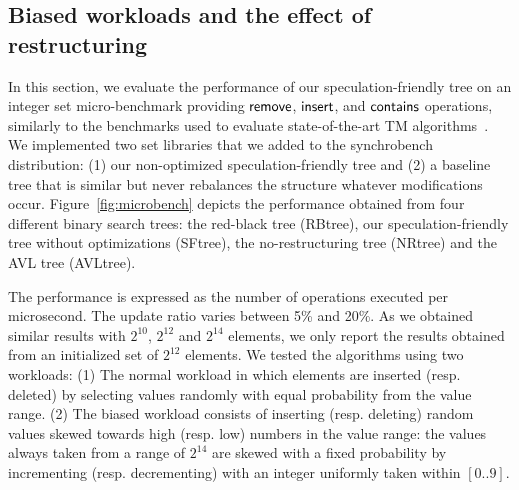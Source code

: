 \subsection{Biased workloads and the effect of restructuring}\label{ssec:microbench}

In this section, we evaluate the performance of our speculation-friendly tree on an integer set micro-benchmark providing $\act{remove}$, $\act{insert}$, and $\act{contains}$ operations, similarly to the benchmarks used to evaluate state-of-the-art TM algorithms~\cite{FFR08,FGG09,DSS10}.
We implemented two set libraries that we added to the synchrobench distribution:
(1) our non-optimized speculation-friendly tree and (2) a baseline tree that is similar but never rebalances the structure whatever modifications occur.
Figure~\ref{fig:microbench} depicts the performance obtained from four different binary search trees: the red-black tree (RBtree), our speculation-friendly tree without optimizations (SFtree), the no-restructuring tree (NRtree) and the AVL tree (AVLtree). 

The performance is expressed as the number of operations executed per microsecond. The update ratio varies between 5\% and 20\%.
As we obtained similar results with $2^{10}$, $2^{12}$ and $2^{14}$ elements, we only report the results obtained from an initialized set of $2^{12}$ elements.
We tested the algorithms using two workloads:
(1) The normal workload in which elements are inserted (resp. deleted) by selecting values randomly with equal probability from the value range.
(2) The biased workload consists of inserting (resp. deleting) random values skewed towards high (resp. low) numbers in the value range:
the values always taken from a range of $2^{14}$ are skewed with a fixed probability by incrementing (resp. decrementing) with an integer uniformly taken within $[0..9]$.


